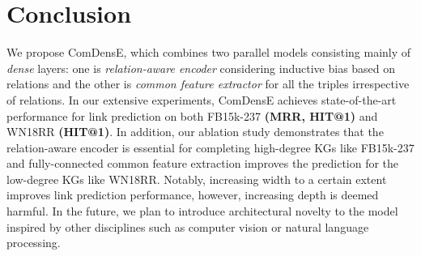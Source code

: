 \section{Conclusion}
We propose ComDensE, which combines two parallel models consisting mainly of \emph{dense} layers: one is \emph{relation-aware encoder} considering inductive bias based on relations and the other is \emph{common feature extractor} for all the triples irrespective of relations. In our extensive experiments, ComDensE achieves state-of-the-art performance for link prediction on both FB15k-237 \textbf{(MRR, HIT@1)} and WN18RR \textbf{(HIT@1)}. In addition, our ablation study demonstrates that the relation-aware encoder is essential for completing high-degree KGs like FB15k-237 and fully-connected common feature extraction improves the prediction for the low-degree KGs like WN18RR. Notably, increasing width to a certain extent improves link prediction performance, however, increasing depth is deemed harmful. In the future, we plan to introduce architectural novelty to the model inspired by other disciplines such as computer vision or natural language processing.  